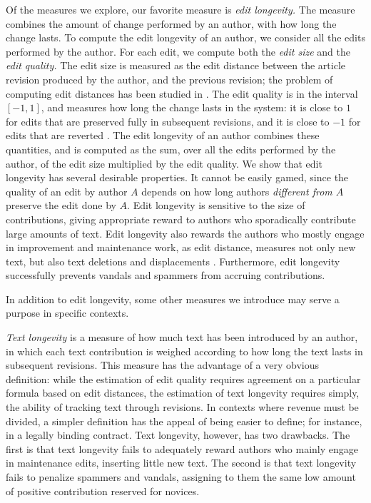 Of the measures we explore, our favorite measure is {\em edit longevity.\/}
The measure combines the amount of change performed by an author, with
how long the change lasts. 
To compute the edit longevity of an author, we consider all the edits
performed by the author. 
For each edit, we compute both the {\em edit size\/} and the 
{\em edit quality.}
The edit size is measured as the edit distance between the article
revision produced by the author, and the previous revision; the
problem of computing edit distances has been studied in 
\cite{EditDist74,TichyEditDist,EditDistanceMoves}. 
The edit quality is in the interval $[-1, 1]$, and measures how long
the change lasts in the system: it is close to $1$ for edits that are
preserved fully in subsequent revisions, and it is close to $-1$ for
edits that are reverted \cite{www07}. 
The edit longevity of an author combines these quantities, and is
computed as the sum, over all the edits performed by the author, of
the edit size multiplied by the edit quality. 
We show that edit longevity has several desirable properties. 
It cannot be easily gamed, since the quality of an edit by author $A$
depends on how long authors {\em different from $A$\/} preserve the
edit done by $A$. 
Edit longevity is sensitive to the size of contributions, giving
appropriate reward to authors who sporadically contribute large
amounts of text. 
Edit longevity also rewards the authors who mostly engage in
improvement and maintenance work, as edit distance, measures not only
new text, but also text deletions and displacements \cite{www07}. 
Furthermore, edit longevity successfully prevents vandals and spammers
from accruing contributions. 

In addition to edit longevity, some other measures we introduce may
serve a purpose in specific contexts. 

{\em Text longevity\/} is a measure of how much text has been
introduced by an author, in which each text contribution is weighed
according to how long the text lasts in subsequent revisions. 
This measure has the advantage of a very obvious definition: while the
estimation of edit quality requires agreement on a particular formula
based on edit distances, the estimation of text longevity requires 
simply, the ability of tracking text through revisions. 
In contexts where revenue must be divided, a simpler definition has
the appeal of being easier to define; for instance, in a legally
binding contract. 
Text longevity, however, has two drawbacks. 
The first is that text longevity fails to adequately reward authors
who mainly engage in maintenance edits, inserting little new text. 
The second is that text longevity fails to penalize spammers and
vandals, assigning to them the same low amount of positive
contribution reserved for novices. 

